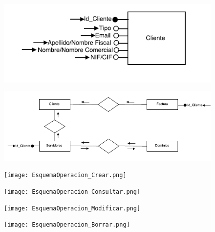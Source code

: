 \documentclass[paper=a4, fontsize=11pt, spanish]{scrartcl}
\begin{document}
\begin{figure}
	\includegraphics[width=1.20\textwidth]{NavModificar.png}
	\caption{}
	\label{fig:NavModificar}
\end{figure}

\begin{figure}
	\includegraphics[width=1.20\textwidth]{NavBorrar.png}
	\caption{}
	\label{fig:NavBorrar}
\end{figure}

\begin{figure}
	\texttt{[image: EsquemaOperacion\_Crear.png]}
	\caption{}
	\label{fig:OpCrear}
\end{figure}

\begin{figure}
	\texttt{[image: EsquemaOperacion\_Consultar.png]}
	\caption{}
	\label{fig:OpConsultar}
\end{figure}

\begin{figure}
	\texttt{[image: EsquemaOperacion\_Modificar.png]}
	\caption{}
	\label{fig:OpModificar}
\end{figure}

\begin{figure}
	\texttt{[image: EsquemaOperacion\_Borrar.png]}
	\caption{}
	\label{fig:OpBorrar}
\end{figure}
\end{document}
